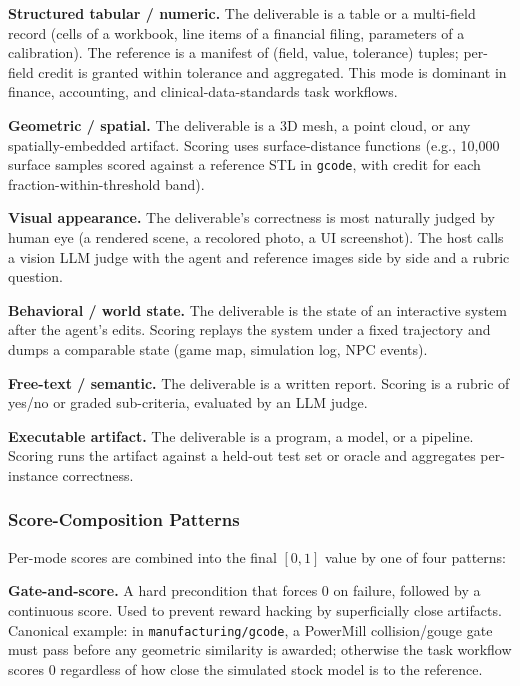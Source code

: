 \noindent \textbf{Structured tabular / numeric.} The deliverable is a table or a multi-field record (cells of a workbook, line items of a financial filing, parameters of a calibration). The reference is a manifest of (field, value, tolerance) tuples; per-field credit is granted within tolerance and aggregated. This mode is dominant in finance, accounting, and clinical-data-standards task workflows.

\noindent \textbf{Geometric / spatial.} The deliverable is a 3D mesh, a point cloud, or any spatially-embedded artifact. Scoring uses surface-distance functions (e.g., 10{,}000 surface samples scored against a reference STL in \texttt{gcode}, with credit for each fraction-within-threshold band).

\noindent \textbf{Visual appearance.} The deliverable's correctness is most naturally judged by human eye (a rendered scene, a recolored photo, a UI screenshot). The host calls a vision LLM judge with the agent and reference images side by side and a rubric question.

\noindent \textbf{Behavioral / world state.} The deliverable is the state of an interactive system after the agent's edits. Scoring replays the system under a fixed trajectory and dumps a comparable state (game map, simulation log, NPC events).

\noindent \textbf{Free-text / semantic.} The deliverable is a written report. Scoring is a rubric of yes/no or graded sub-criteria, evaluated by an LLM judge.

\noindent \textbf{Executable artifact.} The deliverable is a program, a model, or a pipeline. Scoring runs the artifact against a held-out test set or oracle and aggregates per-instance correctness.

\subsubsection{Score-Composition Patterns}
\label{app:eval-composition}

Per-mode scores are combined into the final $[0, 1]$ value by one of four patterns:

\noindent \textbf{Gate-and-score.} A hard precondition that forces $0$ on failure, followed by a continuous score. Used to prevent reward hacking by superficially close artifacts. Canonical example: in \texttt{manufacturing/gcode}, a PowerMill collision/gouge gate must pass before any geometric similarity is awarded; otherwise the task workflow scores $0$ regardless of how close the simulated stock model is to the reference.

